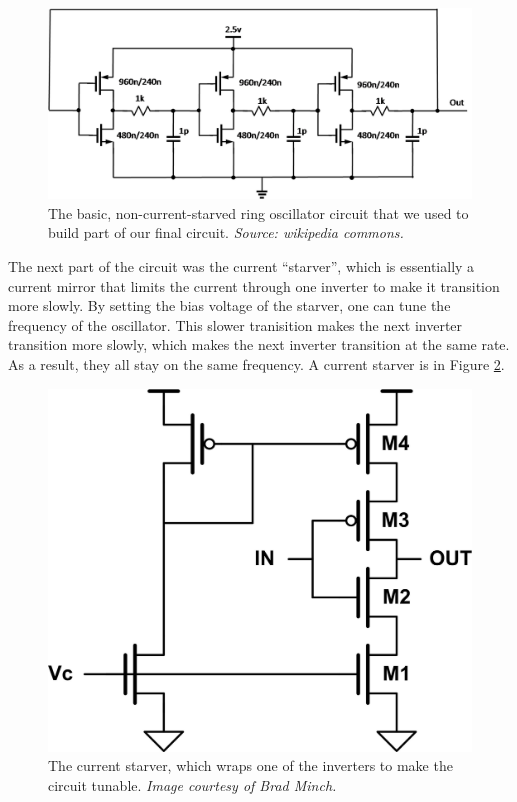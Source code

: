 \documentclass{article}
\begin{document}
\begin{figure}[H]
\centering
\includegraphics[scale=.5]{ringOsc.png}
\caption{The basic, non-current-starved ring oscillator circuit that we used to build part of our final circuit.  \emph{Source: wikipedia commons.}}
\label{ring}
\end{figure}

The next part of the circuit was the current ``starver'', which is essentially a current mirror that limits the current through one inverter to make it transition more slowly. By setting the bias voltage of the starver, one can tune the frequency of the oscillator.  This slower tranisition makes the next inverter transition more slowly, which makes the next inverter transition at the same rate. As a result, they all stay on the same frequency. A current starver is in Figure \ref{starver}. 
					
\begin{figure}[H]	
\centering			
\includegraphics[scale=.5]{starver.jpg}
\caption{The current starver, which wraps one of the inverters to make the circuit tunable. \emph{Image courtesy of Brad Minch.}}
\label{starver}		
\end{figure} 		
\end{document}
